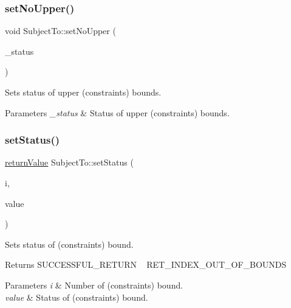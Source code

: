 \subsubsection{\texorpdfstring{set\+No\+Upper()}{setNoUpper()}}
{\footnotesize\ttfamily void Subject\+To\+::set\+No\+Upper (\begin{DoxyParamCaption}\item[{\hyperlink{_types_8hpp_a20f82124c82b6f5686a7fce454ef9089}{Boolean\+Type}}]{\+\_\+status }\end{DoxyParamCaption})\hspace{0.3cm}{\ttfamily [inline]}}

Sets status of upper (constraints\textquotesingle{}) bounds. 
\begin{DoxyParams}{Parameters}
{\em \+\_\+status} & Status of upper (constraints\textquotesingle{}) bounds. \\
\hline
\end{DoxyParams}
\mbox{\label{class_subject_to_a3d444fcbc29b6ae083e2b360706bb248}} 
\subsubsection{\texorpdfstring{set\+Status()}{setStatus()}}
{\footnotesize\ttfamily \hyperlink{_message_handling_8hpp_a81d556f613bfbabd0b1f9488c0fa865e}{return\+Value} Subject\+To\+::set\+Status (\begin{DoxyParamCaption}\item[{\hyperlink{_types_8hpp_ab6fd6105e64ed14a0c9281326f05e623}{int\+\_\+t}}]{i,  }\item[{\hyperlink{_types_8hpp_a70a6a40d261a015ead8d43aa589383a4}{Subject\+To\+Status}}]{value }\end{DoxyParamCaption})\hspace{0.3cm}{\ttfamily [inline]}}

Sets status of (constraints\textquotesingle{}) bound. \begin{DoxyReturn}{Returns}
S\+U\+C\+C\+E\+S\+S\+F\+U\+L\+\_\+\+R\+E\+T\+U\+RN ~\newline
 R\+E\+T\+\_\+\+I\+N\+D\+E\+X\+\_\+\+O\+U\+T\+\_\+\+O\+F\+\_\+\+B\+O\+U\+N\+DS 
\end{DoxyReturn}

\begin{DoxyParams}{Parameters}
{\em i} & Number of (constraints\textquotesingle{}) bound. \\
\hline
{\em value} & Status of (constraints\textquotesingle{}) bound. \\
\hline
\end{DoxyParams}
\mbox{\label{class_subject_to_ab3bb754bbafdaaf99720b6a462d0ca4c}} 

